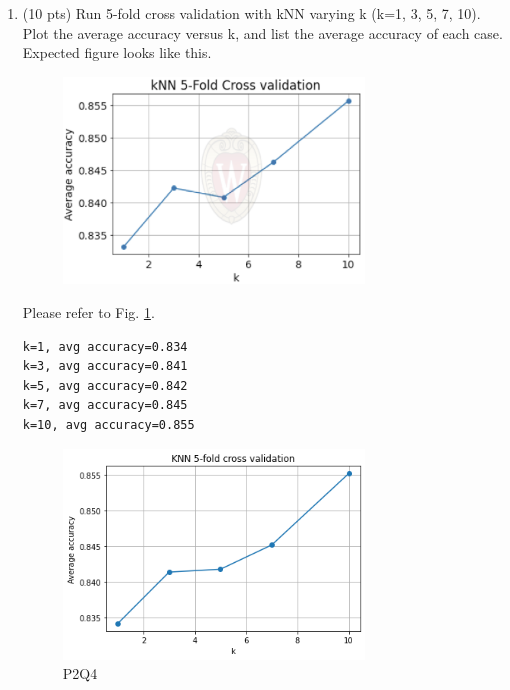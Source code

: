 \documentclass[a4paper]{article}
\theoremstyle{definition}
\newenvironment{soln}{
    \leavevmode\color{blue}\ignorespaces
}{}
\begin{document}
\begin{enumerate}
\begin{soln} \begin{verbatim}
Fold 1 accuracy 0.974
Fold 1 precision 0.936
Fold 1 recall 0.975

Fold 2 accuracy 0.962
Fold 2 precision 0.919
Fold 2 recall 0.945

Fold 3 accuracy 0.938
Fold 3 precision 0.917
Fold 3 recall 0.859

Fold 4 accuracy 0.936
Fold 4 precision 0.913
Fold 4 recall 0.863

Fold 5 accuracy 0.929
Fold 5 precision 0.887
Fold 5 recall 0.879
\end{verbatim}\end{soln}
	
	\item (10 pts) Run 5-fold cross validation with kNN varying k (k=1, 3, 5, 7, 10). Plot the average accuracy versus k, and list the average accuracy of each case. \\
	Expected figure looks like this.
	\begin{figure}[h]
		\centering
		\includegraphics[width=8cm]{knn.png}
	\end{figure}

	\begin{soln} 
 Please refer to Fig. \ref{Q4}.
 
 \begin{verbatim}
k=1, avg accuracy=0.834
k=3, avg accuracy=0.841
k=5, avg accuracy=0.842
k=7, avg accuracy=0.845
k=10, avg accuracy=0.855
\end{verbatim}
 \end{soln}

   	\begin{figure}[h]
		\centering
		\includegraphics[width=8cm]{Q4.png}
        \caption{P2Q4}
        \label{Q4}
	\end{figure}
 

\end{enumerate}
\end{document}
